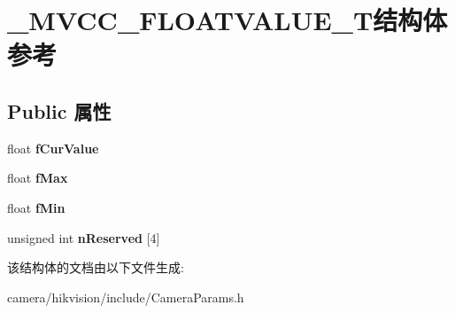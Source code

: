 \hypertarget{struct___m_v_c_c___f_l_o_a_t_v_a_l_u_e___t}{}\section{\+\_\+\+M\+V\+C\+C\+\_\+\+F\+L\+O\+A\+T\+V\+A\+L\+U\+E\+\_\+\+T结构体 参考}
\label{struct___m_v_c_c___f_l_o_a_t_v_a_l_u_e___t}
\subsection*{Public 属性}
\begin{DoxyCompactItemize}
\item 
\mbox{\label{struct___m_v_c_c___f_l_o_a_t_v_a_l_u_e___t_aaef0f2f14d594055424b8ce94c16bb61}} 
float {\bfseries f\+Cur\+Value}
\item 
\mbox{\label{struct___m_v_c_c___f_l_o_a_t_v_a_l_u_e___t_a0b296a0ce41c8c5133502335733965e0}} 
float {\bfseries f\+Max}
\item 
\mbox{\label{struct___m_v_c_c___f_l_o_a_t_v_a_l_u_e___t_ae8ab2c02482231ffb00374b4a9864ff7}} 
float {\bfseries f\+Min}
\item 
\mbox{\label{struct___m_v_c_c___f_l_o_a_t_v_a_l_u_e___t_a4e7936104eddc13ccb74d8c232498fba}} 
unsigned int {\bfseries n\+Reserved} \mbox{[}4\mbox{]}
\end{DoxyCompactItemize}


该结构体的文档由以下文件生成\+:\begin{DoxyCompactItemize}
\item 
camera/hikvision/include/Camera\+Params.\+h\end{DoxyCompactItemize}
